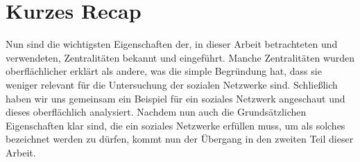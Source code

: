 \section{Kurzes Recap}
Nun sind die wichtigsten Eigenschaften der, in dieser Arbeit betrachteten und verwendeten, Zentralitäten bekannt und eingeführt. Manche Zentralitäten wurden oberflächlicher erklärt als andere, was die simple Begründung hat, dass sie weniger relevant für die Untersuchung der sozialen Netzwerke sind. Schließlich haben wir uns gemeinsam ein Beispiel für ein soziales Netzwerk angeschaut und dieses oberflächlich analysiert.
Nachdem nun auch die Grundsätzlichen Eigenschaften klar sind, die ein soziales Netzwerke erfüllen muss, um als solches bezeichnet werden zu dürfen, kommt nun der Übergang in den zweiten Teil dieser Arbeit. 
